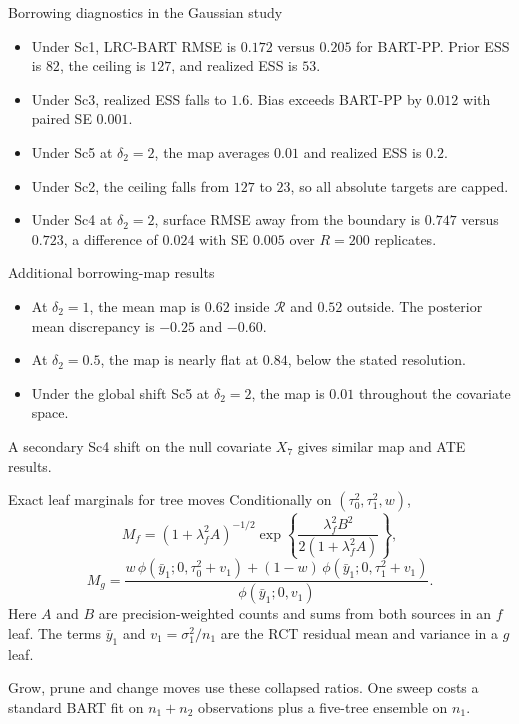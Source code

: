 \documentclass[11pt,aspectratio=169]{beamer}
\begin{document}
\begin{frame}{Borrowing diagnostics in the Gaussian study}
  \small
  \begin{itemize}\setlength\itemsep{0.52em}
    \item Under Sc1, LRC-BART RMSE is $0.172$ versus $0.205$ for BART-PP. Prior ESS is $82$, the ceiling is $127$, and realized ESS is $53$.
    \item Under Sc3, realized ESS falls to $1.6$. Bias exceeds BART-PP by $0.012$ with paired SE $0.001$.
    \item Under Sc5 at $\delta_2=2$, the map averages $0.01$ and realized ESS is $0.2$.
    \item Under Sc2, the ceiling falls from $127$ to $23$, so all absolute targets are capped.
    \item Under Sc4 at $\delta_2=2$, surface RMSE away from the boundary is $0.747$ versus $0.723$, a difference of $0.024$ with SE $0.005$ over $R=200$ replicates.
  \end{itemize}
\end{frame}

\begin{frame}{Additional borrowing-map results}
  \large
  \begin{itemize}\setlength\itemsep{0.75em}
    \item At $\delta_2=1$, the mean map is $0.62$ inside $\mathcal R$ and $0.52$ outside. The posterior mean discrepancy is $-0.25$ and $-0.60$.
    \item At $\delta_2=0.5$, the map is nearly flat at $0.84$, below the stated resolution.
    \item Under the global shift Sc5 at $\delta_2=2$, the map is $0.01$ throughout the covariate space.
  \end{itemize}

  \vfill
  {\small A secondary Sc4 shift on the null covariate $X_7$ gives similar map and ATE results.}
\end{frame}

\begin{frame}{Exact leaf marginals for tree moves}
  \footnotesize
  Conditionally on $(\tau_0^2,\tau_1^2,w)$,
  \[
    M_f=(1+\lambda_f^2A)^{-1/2}
    \exp\left\{\frac{\lambda_f^2B^2}{2(1+\lambda_f^2A)}\right\},
  \]
  \[
    M_g=
    \frac{w\,\phi(\bar y_1;0,\tau_0^2+v_1)
    +(1-w)\,\phi(\bar y_1;0,\tau_1^2+v_1)}
    {\phi(\bar y_1;0,v_1)}.
  \]
  Here $A$ and $B$ are precision-weighted counts and sums from both sources in an $f$ leaf. The terms $\bar y_1$ and $v_1=\sigma_1^2/n_1$ are the RCT residual mean and variance in a $g$ leaf.

  \vspace{0.5em}
  Grow, prune and change moves use these collapsed ratios. One sweep costs a standard BART fit on $n_1+n_2$ observations plus a five-tree ensemble on $n_1$.
\end{frame}
\end{document}
